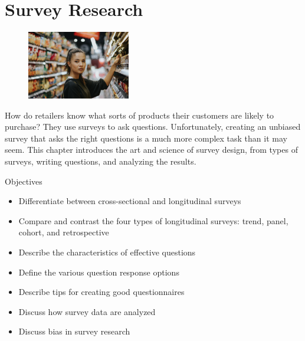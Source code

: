 \chapter{Survey Research}\label{08:surveys}

\begin{figure}
	\label{08:fig01} 
	\centering
	\includegraphics[width=0.4\textwidth]{gfx/08-01} 
\end{figure}

How do retailers know what sorts of products their customers are likely to purchase? They use surveys to ask questions. Unfortunately, creating an unbiased survey that asks the right questions is a much more complex task than it may seem. This chapter introduces the art and science of survey design, from types of surveys, writing questions, and analyzing the results.

\begin{center}
	\begin{objbox}{Objectives}
		\begin{itemize}
			\setlength{\itemsep}{0pt}
			\setlength{\parskip}{0pt}
			\setlength{\parsep}{0pt}
			
			\item Differentiate between cross-sectional and longitudinal surveys
			\item Compare and contrast the four types of longitudinal surveys: trend, panel, cohort, and retrospective
			\item Describe the characteristics of effective questions
			\item Define the various question response options
			\item Describe tips for creating good questionnaires
			\item Discuss how survey data are analyzed
			\item Discuss bias in survey research
		\end{itemize}
	\end{objbox}
\end{center}

